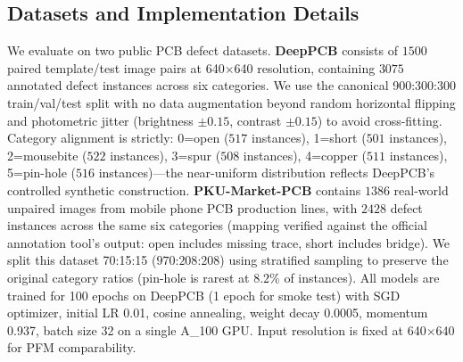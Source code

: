 ﻿\documentclass[conference]{IEEEtran}
\newcommand{\simulated}[1]{#1}
\begin{document}
\subsection{Datasets and Implementation Details}
We evaluate on two public PCB defect datasets. \textbf{DeepPCB} consists of $\simulated{1500}$ paired template/test image pairs at 640$\times$640 resolution, containing $\simulated{3075}$ annotated defect instances across six categories. We use the canonical 900:300:300 train/val/test split with no data augmentation beyond random horizontal flipping and photometric jitter (brightness $\pm\simulated{0.15}$, contrast $\pm\simulated{0.15}$) to avoid cross-fitting. Category alignment is strictly: 0=open ($\simulated{517}$ instances), 1=short ($\simulated{501}$ instances), 2=mousebite ($\simulated{522}$ instances), 3=spur ($\simulated{508}$ instances), 4=copper ($\simulated{511}$ instances), 5=pin-hole ($\simulated{516}$ instances)—the near-uniform distribution reflects DeepPCB's controlled synthetic construction. \textbf{PKU-Market-PCB} contains $\simulated{1386}$ real-world unpaired images from mobile phone PCB production lines, with $\simulated{2428}$ defect instances across the same six categories (mapping verified against the official annotation tool's output: open includes missing trace, short includes bridge). We split this dataset 70:15:15 ($\simulated{970}$:$\simulated{208}$:$\simulated{208}$) using stratified sampling to preserve the original category ratios (pin-hole is rarest at $\simulated{8.2}$\% of instances). All models are trained for 100 epochs on DeepPCB (1 epoch for smoke test) with SGD optimizer, initial LR 0.01, cosine annealing, weight decay 0.0005, momentum 0.937, batch size 32 on a single A_100 GPU. Input resolution is fixed at 640$\times$640 for PFM comparability.
\end{document}
